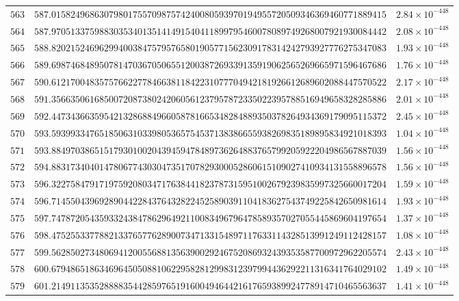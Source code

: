 \documentclass[12pt,reqno]{amsart}
\theoremstyle{remark}
\begin{document}
\begin{longtable}{clc}
$563$ & $587.0158249686307980175570987574240080593970194955720509346369460771889415$ & $2.84\times 10^{-448}$ \\
$564$ & $587.9705133759883035340135141491540411899795460078089749268007921930084442$ & $2.08\times 10^{-448}$ \\
$565$ & $588.8202152469629940038475795765801905771562309178314242793927776275347083$ & $1.93\times 10^{-448}$ \\
$566$ & $589.6987468489507814703670506551200387269339135919062565269665971596467686$ & $1.76\times 10^{-448}$ \\
$567$ & $590.6121700483575766227784663811842231077704942181926612689602088447570522$ & $2.17\times 10^{-448}$ \\
$568$ & $591.3566350616850072087380242060561237957872335022395788516949658328285886$ & $2.01\times 10^{-448}$ \\
$569$ & $592.4473436635954213286884966058781665348284889350378264934369179095115372$ & $2.45\times 10^{-448}$ \\
$570$ & $593.5939933476518506310339805365754537138386655938269835189895834921018393$ & $1.04\times 10^{-448}$ \\
$571$ & $593.8849703865151793010020439459478489736264883765799205922204986567887039$ & $1.56\times 10^{-448}$ \\
$572$ & $594.8831734040147806774303047351707829300052860615109027410934131558896578$ & $1.56\times 10^{-448}$ \\
$573$ & $596.3227584791719759208034717638441823787315951002679239835997325660017204$ & $1.59\times 10^{-448}$ \\
$574$ & $596.7145504396928904422843764328224525890391104183627543749225842650981614$ & $1.93\times 10^{-448}$ \\
$575$ & $597.7478720543593324384786296492110083496796478589357027055445869604197654$ & $1.37\times 10^{-448}$ \\
$576$ & $598.4752553377882133765776289007347133154897117633114328513991249112428157$ & $1.08\times 10^{-448}$ \\
$577$ & $599.5628502734806941200556881356390029246752086932439353587700972962205574$ & $2.43\times 10^{-448}$ \\
$578$ & $600.6794865186346964505088106229582812998312397994436292211316341764029102$ & $1.49\times 10^{-448}$ \\
$579$ & $601.2149113535288883544285976519160049464421617659389924778914710465563637$ & $1.41\times 10^{-448}$ \\

\end{longtable}
\end{document}
